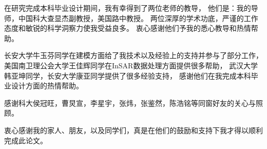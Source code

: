 
\begin{acknowledgements}

在研究完成本科毕业设计期间，我有幸得到了两位老师的教导，
他们是：我的导师，中国科大查显杰副教授，美国路中教授。
两位深厚的学术功底，严谨的工作态度和敏锐的科学洞察力使我受益良多。
衷心感谢他们予我的悉心教导和热情帮助。

长安大学牛玉芬同学在建模方面给了我技术以及经验上的支持并参与了部分工作，
美国南卫理公会大学王佳辉同学在InSAR数据处理方面提供很多帮助，
武汉大学韩亚坤同学，长安大学康亚同学提供了很多经验支持，
感谢他们在我完成本科毕业设计方面的热情帮助。

感谢科大侯冠旺，曹炅宣，李星宇，张炜，张鉴然，陈浩铭等同窗好友的关心与照顾。

衷心感谢我的家人、朋友，以及同学们，真是在他们的鼓励和支持下我才得以顺利完成此论文。

\end{acknowledgements}
